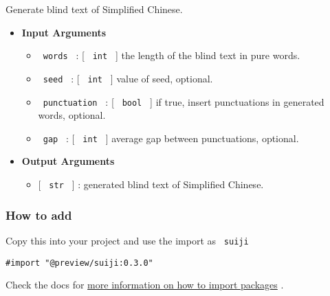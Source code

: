 Generate blind text of Simplified Chinese.

\begin{Shaded}
\begin{Highlighting}[]
\end{Highlighting}
\end{Shaded}

\begin{itemize}
\item
  \textbf{Input Arguments}

  \begin{itemize}
  \tightlist
  \item
    \texttt{\ words\ } : {[} \texttt{\ int\ } {]} the length of the
    blind text in pure words.
  \item
    \texttt{\ seed\ } : {[} \texttt{\ int\ } {]} value of seed,
    optional.
  \item
    \texttt{\ punctuation\ } : {[} \texttt{\ bool\ } {]} if true, insert
    punctuations in generated words, optional.
  \item
    \texttt{\ gap\ } : {[} \texttt{\ int\ } {]} average gap between
    punctuations, optional.
  \end{itemize}
\item
  \textbf{Output Arguments}

  \begin{itemize}
  \tightlist
  \item
    {[} \texttt{\ str\ } {]} : generated blind text of Simplified
    Chinese.
  \end{itemize}
\end{itemize}

\subsubsection{How to add}\label{how-to-add}

Copy this into your project and use the import as \texttt{\ suiji\ }

\begin{verbatim}
#import "@preview/suiji:0.3.0"
\end{verbatim}



Check the docs for
\href{https://typst.app/docs/reference/scripting/\#packages}{more
information on how to import packages} .

